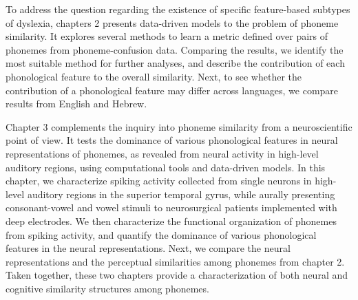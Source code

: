 To address the question regarding the existence of specific feature-based subtypes of dyslexia, chapters 2 presents data-driven models to the problem of phoneme similarity. It explores several methods to learn a metric defined over pairs of phonemes from phoneme-confusion data. Comparing the results, we identify the most suitable method for further analyses, and describe the contribution of each phonological feature to the overall similarity. Next, to see whether the contribution of a phonological feature may differ across languages, we compare results from English and Hebrew.

Chapter 3 complements the inquiry into phoneme similarity from a neuroscientific point of view. It tests the dominance of various phonological features in neural representations of phonemes, as revealed from neural activity in high-level auditory regions, using computational tools and data-driven models. In this chapter, we characterize spiking activity collected from single neurons in high-level auditory regions in the superior temporal gyrus, while aurally presenting consonant-vowel and vowel stimuli to neurosurgical patients implemented with deep electrodes. We then characterize the functional organization of phonemes from spiking activity, and quantify the dominance of various phonological features in the neural representations. Next, we compare the neural representations and the perceptual similarities among phonemes from chapter 2. Taken together, these two chapters provide a characterization of both neural and cognitive similarity structures among phonemes. 